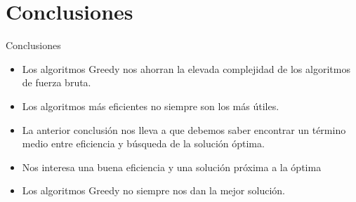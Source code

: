 \documentclass[10pt, xcolor=table]{beamer}
\begin{document}
\section{Conclusiones}

\begin{frame}[fragile]{Conclusiones}
	\begin{itemize}
		\item Los algoritmos Greedy nos ahorran la elevada complejidad de los algoritmos de fuerza bruta.
		\item Los algoritmos más eficientes no siempre son los más útiles.
		\item La anterior conclusión nos lleva a que debemos saber encontrar un término medio entre eficiencia y búsqueda de la solución óptima.
		\item Nos interesa una buena eficiencia y una solución próxima a la óptima
		\item Los algoritmos Greedy no siempre nos dan la mejor solución.
		
	\end{itemize}
\end{frame}
\end{document}
